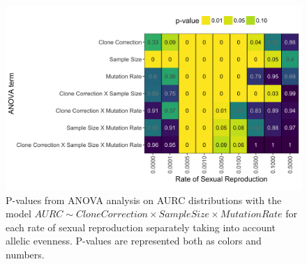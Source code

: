 \documentclass[double,11pt]{beavtex}
\begin{document}
  \begin{figure}
  
  {\centering \includegraphics[width=1\linewidth]{figure/simulations/AURC_ANOVA_ea} 
  
  }
  
  \caption[P-values from ANOVA analysis on AURC distributions with the model
  \(AURC \sim Clone Correction \times Sample Size \times Mutation Rate\)
  for each rate of sexual reproduction separately taking into account
  allelic evenness.]{P-values from ANOVA analysis on AURC distributions with the model
  \(AURC \sim Clone Correction \times Sample Size \times Mutation Rate\)
  for each rate of sexual reproduction separately taking into account
  allelic evenness. P-values are represented both as colors and numbers.}\label{fig:sim3a}
  \end{figure}
  
\end{document}
